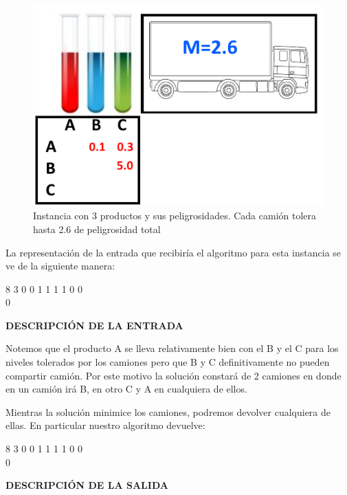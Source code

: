 \begin{figure}[H]
\centering
\includegraphics[scale=0.65]{ej3/instancia1.png}
\caption{Instancia con 3 productos y sus peligrosidades. Cada camión tolera hasta 2.6 de peligrosidad total}
\end{figure}

La representación de la entrada que recibiría el algoritmo para esta instancia se ve de la siguiente manera:

\begin{addmargin}[4em]{0em}
\textsf{8 3 0 0 1 1 1 1 0 0} \\
\textsf{0}
\end{addmargin}
\textbf{DESCRIPCIÓN DE LA ENTRADA}

Notemos que el producto A se lleva relativamente bien con el B y el C para los niveles tolerados por los camiones pero que B y C definitivamente no pueden compartir camión. Por este motivo la solución constará de 2 camiones en donde en un camión irá B, en otro C y A en cualquiera de ellos. 

Mientras la solución minimice los camiones, podremos devolver cualquiera de ellas. En particular nuestro algoritmo devuelve: 

\begin{addmargin}[4em]{0em}
\textsf{8 3 0 0 1 1 1 1 0 0} \\
\textsf{0}
\end{addmargin}

\textbf{DESCRIPCIÓN DE LA SALIDA}


